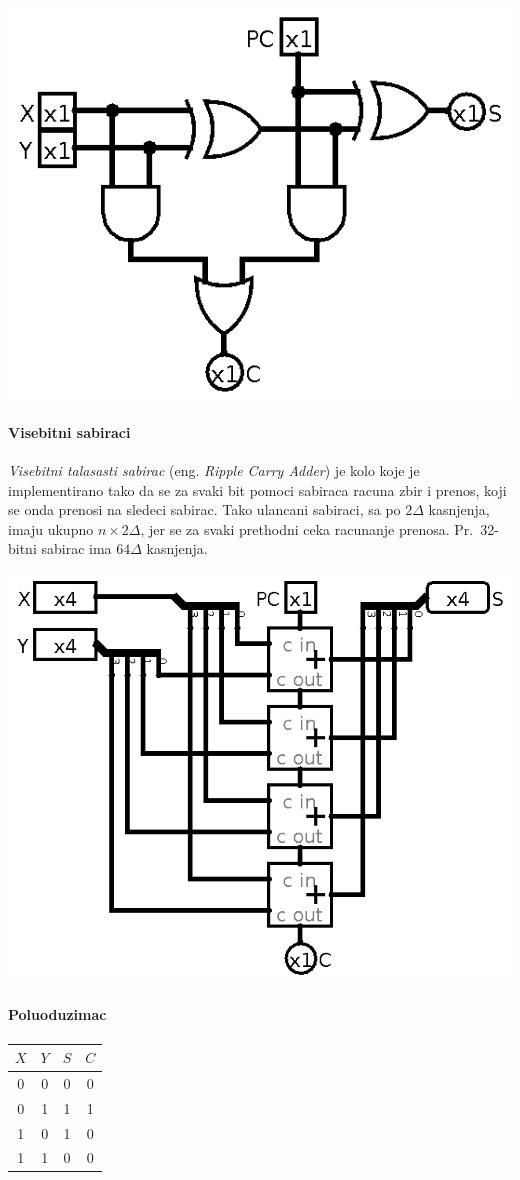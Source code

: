 \documentclass[12p,a4paper]{article}
\begin{document}
\begin{multicols}{2}
    \includegraphics[width=0.7\columnwidth]{Figures/full_adder.png}

    \paragraph{Visebitni sabiraci}
    
    \emph{Visebitni talasasti sabirac} (eng. \emph{Ripple Carry Adder}) je 
    kolo koje je implementirano tako da se za svaki bit pomoci sabiraca 
    racuna zbir i prenos, koji se onda prenosi na sledeci sabirac. Tako 
    ulancani sabiraci, sa po $2\Delta$ kasnjenja, imaju ukupno 
    $n \times 2\Delta$, jer se za svaki prethodni ceka racunanje prenosa. 
    Pr.\ 32-bitni sabirac ima $64\Delta$ kasnjenja.

    \includegraphics[width=0.7\columnwidth]{Figures/riplle_carry_adder.png}

    \paragraph{Poluoduzimac}
    
    \begin{tabular}{*{4}{c}}
        $X$ & $Y$ & $S$ & $C$ \\
        \midrule
         0  &  0  &  0  &  0  \\
         0  &  1  &  1  &  1  \\
         1  &  0  &  1  &  0  \\
         1  &  1  &  0  &  0  \\
    \end{tabular}


\end{multicols}
\end{document}
